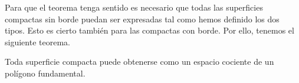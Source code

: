 \documentclass[GTS.tex]{subfiles}
\begin{document}
\begin{observacion}
\end{observacion}

Para que el teorema tenga sentido es necesario que todas las superficies compactas sin borde puedan ser expresadas tal como hemos definido los dos tipos. Esto es cierto también para las compactas con borde. Por ello, tenemos el siguiente teorema.

\begin{teorema} Toda superficie compacta puede obtenerse  como un espacio cociente de un polígono fundamental.
\end{teorema}

\newpage
\end{document}
